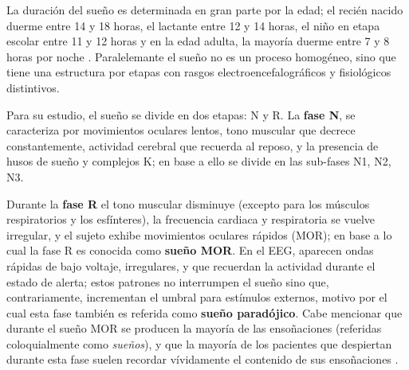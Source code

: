La duración del sueño es determinada en gran parte por la edad; el recién nacido duerme entre 14 y 
18 horas, el lactante entre 12 y 14 horas, el niño en etapa escolar entre 11 y 12 horas y en la 
edad adulta, la mayoría duerme entre 7 y 8 horas por noche \cite{Contreras13}.
%
Paralelemante el sueño no es un proceso homogéneo, sino que tiene una estructura por etapas con 
rasgos electroencefalográficos y fisiológicos distintivos.

Para su estudio, el sueño se divide en dos etapas: N y R.
%
La \textbf{fase N}, se caracteriza por movimientos oculares lentos, tono muscular que decrece 
constantemente, actividad cerebral que recuerda al reposo, y la presencia de husos de sueño y 
complejos K; en base a ello se divide en las sub-fases N1, N2, N3.

Durante la \textbf{fase R} el tono muscular disminuye (excepto para los músculos respiratorios y 
los esfínteres), la frecuencia cardiaca y respiratoria se vuelve irregular, y el sujeto exhibe 
movimientos oculares rápidos (MOR); en base a lo cual la fase R es conocida como \textbf{sueño 
MOR}.
%
En el EEG, aparecen ondas rápidas de bajo voltaje, irregulares, y que recuerdan la actividad 
durante el estado de alerta; estos patrones no interrumpen el sueño sino que, contrariamente,
incrementan el umbral para estímulos externos, motivo por el cual esta fase también es referida 
como \textbf{sueño paradójico}.
%
Cabe mencionar que durante el sueño MOR se producen la mayoría de las ensoñaciones (referidas 
coloquialmente como \textit{sueños}), y que la mayoría de los pacientes que despiertan durante esta 
fase suelen recordar vívidamente el contenido de sus ensoñaciones \cite{Rosales14}.

